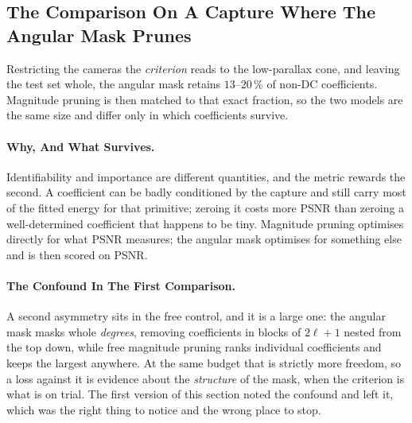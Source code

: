 \subsection*{The Comparison On A Capture Where The Angular Mask Prunes}
\label{sec:b2loses}

Restricting the cameras the \emph{criterion} reads to the low-parallax cone, and
leaving the test set whole, the angular mask retains $13$--$20\,\%$ of non-DC coefficients.
Magnitude pruning is then matched to that exact fraction, so the two models are
the same size and differ only in which coefficients survive.




\paragraph{Why, And What Survives.} Identifiability and importance are different
quantities, and the metric rewards the second. A coefficient can be badly
conditioned by the capture and still carry most of the fitted energy for that
primitive; zeroing it costs more PSNR than zeroing a well-determined coefficient
that happens to be tiny. Magnitude pruning optimises directly for what PSNR measures; the angular mask
optimises for something else and is then scored on PSNR.

\paragraph{The Confound In The First Comparison.} A second asymmetry sits in the
free control, and it is a large one: the angular mask masks whole
\emph{degrees}, removing coefficients in blocks of $2\ell+1$ nested from the top
down, while free magnitude pruning ranks individual coefficients and keeps the
largest anywhere. At the same budget that is strictly more freedom, so a loss against it is evidence about the \emph{structure} of the mask, when
the criterion is what is on trial. The first version of this
section noted the confound and left it, which was the right thing to notice and
the wrong place to stop.

